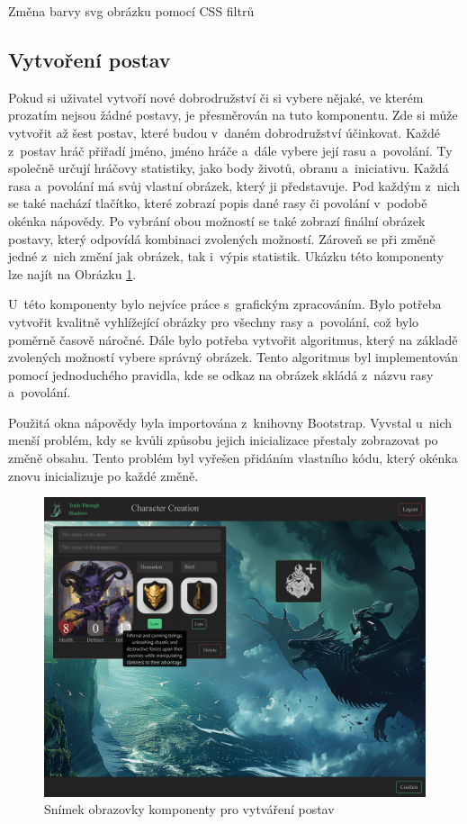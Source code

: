 \begin{listing}[H]
  \inputminted[breaklines]{css}{resources/code/svg_color.css}
  \caption{Změna barvy svg obrázku pomocí CSS filtrů}
  \label{code:svg_filter}
\end{listing}

\subsection{Vytvoření postav}
Pokud si uživatel vytvoří nové dobrodružství či si vybere nějaké, ve kterém prozatím nejsou žádné postavy, je přesměrován na tuto komponentu. Zde si může vytvořit až šest postav, které budou v~daném dobrodružství účinkovat. Každé z~postav hráč přiřadí jméno, jméno hráče a~dále vybere její rasu a~povolání. Ty společně určují hráčovy statistiky, jako body životů, obranu a~iniciativu. Každá rasa a~povolání má svůj vlastní obrázek, který ji představuje. Pod každým z~nich se také nachází tlačítko, které zobrazí popis dané rasy či povolání v~podobě okénka nápovědy. Po vybrání obou možností se také zobrazí finální obrázek postavy, který odpovídá kombinaci zvolených možností. Zároveň se při změně jedné z~nich změní jak obrázek, tak i~výpis statistik. Ukázku této komponenty lze najít na Obrázku \ref{fig:character-creation}.

U~této komponenty bylo nejvíce práce s~grafickým zpracováním. Bylo potřeba vytvořit kvalitně vyhlížející obrázky pro všechny rasy a~povolání, což bylo poměrně časově náročné. Dále bylo potřeba vytvořit algoritmus, který na základě zvolených možností vybere správný obrázek. Tento algoritmus byl implementován pomocí jednoduchého pravidla, kde se odkaz na obrázek skládá z~názvu rasy a~povolání.

Použitá okna nápovědy byla importována z~knihovny Bootstrap. Vyvstal u~nich menší problém, kdy se kvůli způsobu jejich inicializace přestaly zobrazovat po změně obsahu. Tento problém byl vyřešen přidáním vlastního kódu, který okénka znovu inicializuje po každé změně.

\begin{figure}[H]
  \centering
  \includegraphics[width=.95\textwidth]{resources/figures/TTS-Charracter Creation.png}
  \caption{Snímek obrazovky komponenty pro vytváření postav}
  \label{fig:character-creation}
\end{figure}

